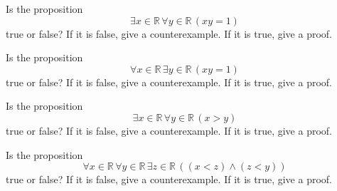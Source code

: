 \documentclass[12pt]{midterm}
\begin{document}
\begin{exam}
\begin{solution}\begin{solutiontext}
\end{solutiontext}\end{solution}

\begin{problem}[360]
  Is the proposition
  $$
  \exists x \in \mathbb{R}\,\forall y \in \mathbb{R}\, (xy = 1)
  $$
  true or false?  If it is false, give a counterexample.  If it is true, give a proof.
\end{problem}

\begin{solution}\begin{solutiontext}
\end{solutiontext}\end{solution}

\begin{problem}[360]
  Is the proposition
  $$
  \forall x \in \mathbb{R}\,\exists y \in \mathbb{R}\, (xy = 1)
  $$
  true or false?  If it is false, give a counterexample.  If it is true, give a proof.
\end{problem}

\begin{solution}\begin{solutiontext}
\end{solutiontext}\end{solution}


\begin{problem}[360]
  Is the proposition
  $$
  \exists x \in \mathbb{R}\, \forall y \in \mathbb{R}\, (x > y)
  $$
  true or false?  If it is false, give a counterexample.  If it is true, give a proof.
\end{problem}

\begin{solution}\begin{solutiontext}
\end{solutiontext}\end{solution}


\begin{problem}[360]
  Is the proposition
  $$
  \forall x \in \mathbb{R}\, \forall y \in \mathbb{R}\, \exists z \in \mathbb{R}\, \left( \left( x < z \right) \wedge (z < y) \right)
  $$
  true or false?  If it is false, give a counterexample.  If it is true, give a proof.
\end{problem}


\end{exam}
\end{document}
